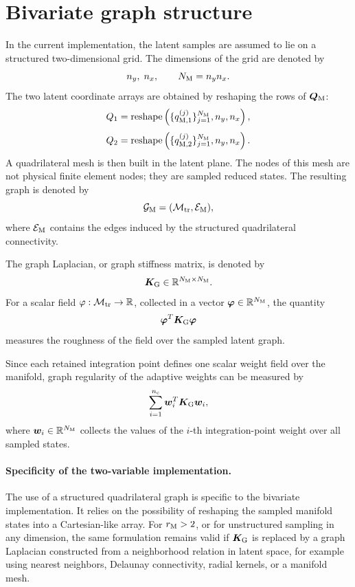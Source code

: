\documentclass[11pt,a4paper]{article}
\begin{document}
\section{Bivariate graph structure}

In the current implementation, the latent samples are assumed to lie on a
structured two-dimensional grid. The dimensions of the grid are denoted by
\[
        n_y,\; n_x,
        \qquad
        N_{\mathrm{M}}=n_y n_x .
\]
The two latent coordinate arrays are obtained by reshaping the rows of
$\bm Q_{\mathrm{M}}$:
\[
        Q_1 = \operatorname{reshape}
        \left(
        \{q_{\mathrm{M},1}^{(j)}\}_{j=1}^{N_{\mathrm{M}}},
        n_y,n_x
        \right),
\]
\[
        Q_2 = \operatorname{reshape}
        \left(
        \{q_{\mathrm{M},2}^{(j)}\}_{j=1}^{N_{\mathrm{M}}},
        n_y,n_x
        \right).
\]
A quadrilateral mesh is then built in the latent plane. The nodes of this mesh
are not physical finite element nodes; they are sampled reduced states. The
resulting graph is denoted by
\[
        \mathcal{G}_{\mathrm{M}}=(\mathcal{M}_{\mathrm{tr}},\mathcal{E}_{\mathrm{M}}),
\]
where $\mathcal{E}_{\mathrm{M}}$ contains the edges induced by the structured quadrilateral
connectivity.

The graph Laplacian, or graph stiffness matrix, is denoted by
\[
        \bm K_{\mathrm{G}}\in\mathbb{R}^{N_{\mathrm{M}}\times N_{\mathrm{M}}}.
\]
For a scalar field $\varphi:\mathcal{M}_{\mathrm{tr}}\to\mathbb{R}$, collected in a vector
$\bm\varphi\in\mathbb{R}^{N_{\mathrm{M}}}$, the quantity
\[
        \bm\varphi^T\bm K_{\mathrm{G}}\bm\varphi
\]
measures the roughness of the field over the sampled latent graph.

Since each retained integration point defines one scalar weight field over the
manifold, graph regularity of the adaptive weights can be measured by
\[
        \sum_{i=1}^{n_{\mathrm{c}}}
        \bm w_i^T\bm K_{\mathrm{G}}\bm w_i,
\]
where $\bm w_i\in\mathbb{R}^{N_{\mathrm{M}}}$ collects the values of the $i$-th integration-point
weight over all sampled states.

\paragraph{Specificity of the two-variable implementation.}
The use of a structured quadrilateral graph is specific to the bivariate
implementation. It relies on the possibility of reshaping the sampled manifold
states into a Cartesian-like array. For $r_{\mathrm{M}}>2$, or for unstructured sampling
in any dimension, the same formulation remains valid if $\bm K_{\mathrm{G}}$ is replaced
by a graph Laplacian constructed from a neighborhood relation in latent space,
for example using nearest neighbors, Delaunay connectivity, radial kernels, or
a manifold mesh.
\end{document}
